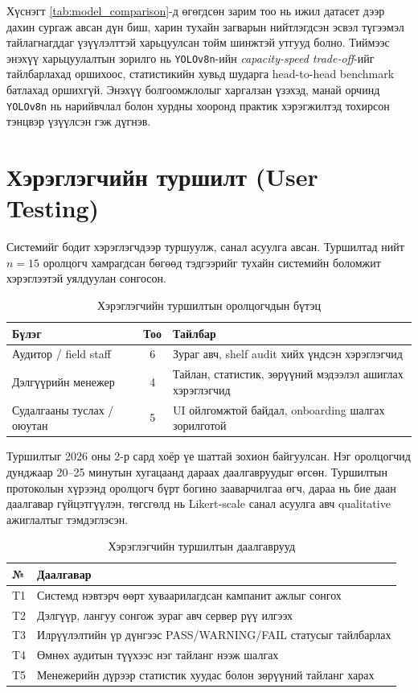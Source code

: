Хүснэгт \ref{tab:model_comparison}-д өгөгдсөн зарим тоо нь ижил датасет дээр дахин сургаж авсан дүн биш, харин тухайн загварын нийтлэгдсэн эсвэл түгээмэл тайлагнагддаг үзүүлэлттэй харьцуулсан тойм шинжтэй утгууд болно. Тиймээс энэхүү харьцуулалтын зорилго нь \texttt{YOLOv8n}-ийн \textit{capacity-speed trade-off}-ийг тайлбарлахад оршихоос, статистикийн хувьд шударга head-to-head benchmark батлахад оршихгүй. Энэхүү болгоомжлолыг харгалзан үзэхэд, манай орчинд \texttt{YOLOv8n} нь нарийвчлал болон хурдны хооронд практик хэрэгжилтэд тохирсон тэнцвэр үзүүлсэн гэж дүгнэв.

\section{Хэрэглэгчийн туршилт (User Testing)}

Системийг бодит хэрэглэгчдээр туршуулж, санал асуулга авсан. Туршилтад нийт \(n=15\) оролцогч хамрагдсан бөгөөд тэдгээрийг тухайн системийн боломжит хэрэглээтэй уялдуулан сонгосон.

\begin{longtable}{|p{3.5cm}|c|p{6cm}|}
\caption{Хэрэглэгчийн туршилтын оролцогчдын бүтэц}
\label{tab:user_test_participants} \\
\hline
\textbf{Бүлэг} & \textbf{Тоо} & \textbf{Тайлбар} \\
\hline
Аудитор / field staff & 6 & Зураг авч, shelf audit хийх үндсэн хэрэглэгчид \\
\hline
Дэлгүүрийн менежер & 4 & Тайлан, статистик, зөрүүний мэдээлэл ашиглах хэрэглэгчид \\
\hline
Судалгааны туслах / оюутан & 5 & UI ойлгомжтой байдал, onboarding шалгах зорилготой \\
\hline
\end{longtable}

Туршилтыг 2026 оны 2-р сард хоёр үе шаттай зохион байгуулсан. Нэг оролцогчид дунджаар 20--25 минутын хугацаанд дараах даалгавруудыг өгсөн. Туршилтын протоколын хүрээнд оролцогч бүрт богино зааварчилгаа өгч, дараа нь бие даан даалгавар гүйцэтгүүлэн, төгсгөлд нь Likert-scale санал асуулга авч qualitative ажиглалтыг тэмдэглэсэн.

\begin{longtable}{|p{0.9cm}|p{10.4cm}|}
\caption{Хэрэглэгчийн туршилтын даалгаврууд}
\label{tab:user_test_tasks} \\
\hline
\textbf{№} & \textbf{Даалгавар} \\
\hline
T1 & Системд нэвтэрч өөрт хуваарилагдсан кампанит ажлыг сонгох \\
\hline
T2 & Дэлгүүр, лангуу сонгож зураг авч сервер рүү илгээх \\
\hline
T3 & Илрүүлэлтийн үр дүнгээс PASS/WARNING/FAIL статусыг тайлбарлах \\
\hline
T4 & Өмнөх аудитын түүхээс нэг тайланг нээж шалгах \\
\hline
T5 & Менежерийн дүрээр статистик хуудас болон зөрүүний тайланг харах \\
\hline
\end{longtable}

